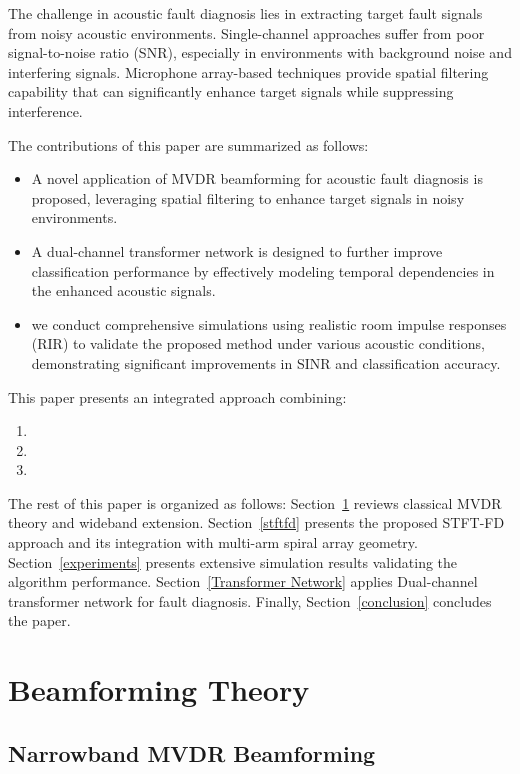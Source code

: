 \documentclass[journal]{IEEEtran}
\begin{document}
The challenge in acoustic fault diagnosis lies in extracting target fault signals from noisy acoustic environments. Single-channel approaches suffer from poor signal-to-noise ratio (SNR), especially in environments with background noise and interfering signals. Microphone array-based techniques provide spatial filtering capability that can significantly enhance target signals while suppressing interference.

The contributions of this paper are summarized as follows:
\begin{itemize}
    \item A novel application of MVDR beamforming for acoustic fault diagnosis is proposed, leveraging spatial filtering to enhance target signals in noisy environments.
    \item A dual-channel transformer network is designed to further improve classification performance by effectively modeling temporal dependencies in the enhanced acoustic signals.
    \item we conduct comprehensive simulations using realistic room impulse responses (RIR) to validate the proposed method under various acoustic conditions, demonstrating significant improvements in SINR and classification accuracy.
\end{itemize}

This paper presents an integrated approach combining:
\begin{enumerate}
    \item 
    \item 
    \item 
\end{enumerate}

The rest of this paper is organized as follows: Section~\ref{Beamforming} reviews classical MVDR theory and wideband extension. Section~\ref{stftfd} presents the proposed STFT-FD approach and its integration with multi-arm spiral array geometry. Section~\ref{experiments} presents extensive simulation results validating the algorithm performance. Section~\ref{Transformer Network} applies Dual-channel transformer network for fault diagnosis. Finally, Section~\ref{conclusion} concludes the paper.
\section{Beamforming Theory}
\label{Beamforming}
\subsection{Narrowband MVDR Beamforming}
\end{document}
